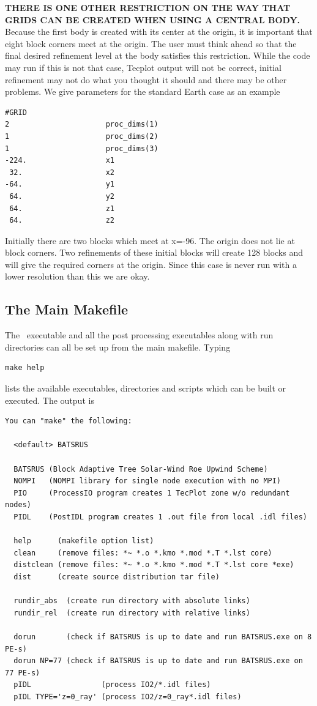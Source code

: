 {\bf THERE IS ONE OTHER RESTRICTION ON THE WAY THAT GRIDS CAN BE CREATED
WHEN USING A CENTRAL BODY.}
Because the first body is created with its center at the origin, it is
important that eight block corners meet at the origin.  The user must 
think ahead so that the final desired refinement level at the body
satisfies this restriction.  While
the code may run if this is not that case, Tecplot output will not be
correct, initial refinement may not do what you thought it should and
there may be other problems.  
We give parameters for the standard Earth case as an example
\begin{verbatim}
#GRID        
2                      proc_dims(1)
1                      proc_dims(2)
1                      proc_dims(3)
-224.                  x1 
 32.                   x2 
-64.                   y1 
 64.                   y2 
 64.                   z1 
 64.                   z2 
\end{verbatim}
Initially there are two blocks which meet at x=-96. 
The origin does not lie at block corners.
Two refinements of these initial blocks will create 128 blocks and
will give the required corners at the origin.  Since this case is
never run with a lower resolution than this we are okay.


\subsection{The Main Makefile \label{section:main_make}}

The \BATSRUS\ executable and all the post processing executables along
with run directories can all be set up from the main makefile.  Typing
\begin{verbatim}
make help
\end{verbatim}
lists the available executables, directories and scripts which can be built 
or executed.  The output is 

\begin{verbatim}
You can "make" the following:

  <default> BATSRUS

  BATSRUS (Block Adaptive Tree Solar-Wind Roe Upwind Scheme)
  NOMPI   (NOMPI library for single node execution with no MPI)
  PIO     (ProcessIO program creates 1 TecPlot zone w/o redundant nodes)
  PIDL    (PostIDL program creates 1 .out file from local .idl files)

  help      (makefile option list)
  clean     (remove files: *~ *.o *.kmo *.mod *.T *.lst core)
  distclean (remove files: *~ *.o *.kmo *.mod *.T *.lst core *exe)
  dist      (create source distribution tar file)

  rundir_abs  (create run directory with absolute links)
  rundir_rel  (create run directory with relative links)

  dorun       (check if BATSRUS is up to date and run BATSRUS.exe on 8 PE-s)
  dorun NP=77 (check if BATSRUS is up to date and run BATSRUS.exe on 77 PE-s)
  pIDL                (process IO2/*.idl files)
  pIDL TYPE='z=0_ray' (process IO2/z=0_ray*.idl files)
\end{verbatim}

